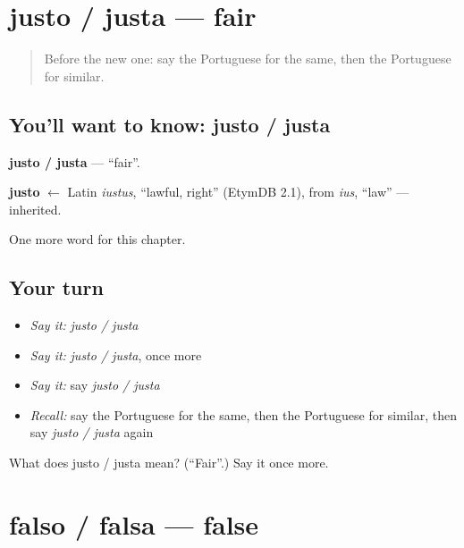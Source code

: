 \section[justo / justa]{justo / justa — fair}

\label{lesson:PT-C186-justo-justa}



\begin{quote}
Before the new one: say the Portuguese for the same, then the Portuguese for similar.
\end{quote}

\subsection*{You'll want to know: justo / justa}
\textbf{justo / justa} — \textquotedblleft{}fair\textquotedblright{}.

\begin{cousinweb}
\textbf{justo} $\leftarrow$ Latin \emph{iustus}, \textquotedblleft{}lawful, right\textquotedblright{} (EtymDB 2.1), from \emph{ius}, \textquotedblleft{}law\textquotedblright{} — inherited.
\end{cousinweb}

\begin{grammarlens}[title={What you've built}]
One more word for this chapter.
\end{grammarlens}

\subsection*{Your turn}
\begin{itemize}
\raggedright
  \item \emph{Say it:} \emph{justo / justa}
  \item \emph{Say it:} \emph{justo / justa}, once more
  \item \emph{Say it:} say \emph{justo / justa}
  \item \emph{Recall:} say the Portuguese for the same, then the Portuguese for similar, then say \emph{justo / justa} again
\end{itemize}

\begin{tcolorbox}[breakable,colback=teal!4,colframe=teal!35!black,title={Before you move on}]
What does justo / justa mean? (\textquotedblleft{}Fair\textquotedblright{}.) Say it once more.
\end{tcolorbox}
\section[falso / falsa]{falso / falsa — false}

